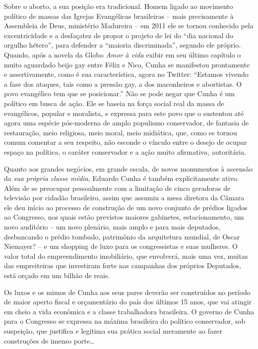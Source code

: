 Sobre o aborto, a sua posição era tradicional. Homem ligado ao movimento
político de massas das Igrejas Evangélicas brasileiras -- mais
precisamente à Assembleia de Deus, ministério Madureira -- em 2011 ele
se tornou conhecido pela excentricidade e a desfaçatez de propor o
projeto de lei do ``dia nacional do orgulho hétero'', para defender a
``maioria discriminada'', segundo ele próprio. Quando, após a novela da
Globo \emph{Amor à vida} exibir em seu último capítulo o muito aguardado
beijo gay entre Félix e Nico, Cunha se manifestou prontamente e
assertivamente, como é sua característica, agora no Twitter: ``Estamos
vivendo a fase dos ataques, tais como a pressão gay, a dos maconheiros e
abortistas. O povo evangélico tem que se posicionar.'' Não se pode negar
que Cunha é um político em busca de ação. Ele se baseia na força social
real da massa de evangélicos, popular e moralista, e expressa para este
povo que o sustentou até agora uma espécie pós-moderna de amplo
populismo conservador, de fantasia de restauração, meio religiosa, meio
moral, meio midiática, que, como se tornou comum comentar a seu
respeito, não esconde o vínculo entre o desejo de ocupar espaço na
política, o caráter conservador e a ação muito afirmativa, autoritária.

Quanto aos grandes negócios, em grande escala, de novos monumentos à
ascensão da \emph{sua própria classe média}, Eduardo Cunha é também
explicitamente ativo. Além de se preocupar pessoalmente com a limitação
de cinco geradoras de televisão por cidadão brasileiro, assim que
assumiu a mesa diretora da Câmara ele deu início ao processo de
construção de um novo conjunto de prédios ligados ao Congresso, nos
quais estão previstos maiores gabinetes, estacionamento, um novo
auditório -- um novo plenário, mais amplo e para mais deputados,
desbancando o prédio tombado, patrimônio da arquitetura mundial, de
Oscar Niemayer? -- e um shopping de luxo para os congressistas e suas
mulheres. O valor total do empreendimento imobiliário, que envolverá,
mais uma vez, muitas das empreiteiras que investiram forte nas campanhas
dos próprios Deputados, está orçado em um bilhão de reais.

Os luxos e os mimos de Cunha aos seus pares deverão ser construídos no
período de maior aperto fiscal e orçamentário do país dos últimos 15
anos, que vai atingir em cheio a vida econômica e a classe trabalhadora
brasileira. O governo de Cunha para o Congresso se expressa na máxima
brasileira do político conservador, sob suspeição, que justifica e
legitima sua prática social meramente ao fazer construções de imenso
porte…

